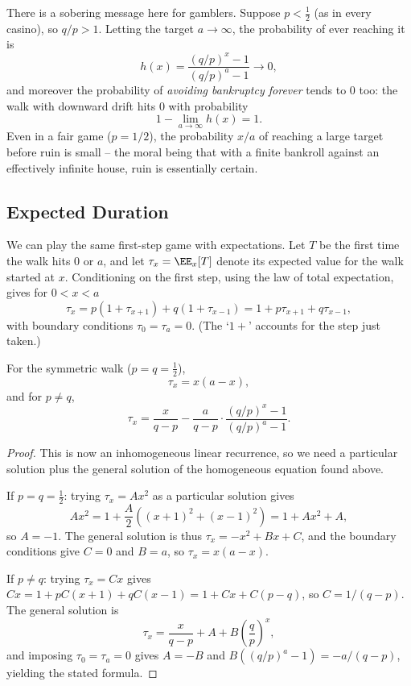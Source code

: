 There is a sobering message here for gamblers. Suppose $p < \frac12$ (as in every casino), so $q/p > 1$. Letting the target $a \rightarrow \infty$, the probability of ever reaching it is
$$
h(x) = \frac{(q/p)^x - 1}{(q/p)^a - 1} \longrightarrow 0,
$$
and moreover the probability of \emph{avoiding bankruptcy forever} tends to $0$ too: the walk with downward drift hits $0$ with probability
$$
1 - \lim_{a \to \infty}h(x) = 1.
$$
Even in a fair game ($p = 1/2$), the probability $x/a$ of reaching a large target before ruin is small -- the moral being that with a finite bankroll against an effectively infinite house, ruin is essentially certain.

\subsection{Expected Duration}

We can play the same first-step game with expectations. Let $T$ be the first time the walk hits $0$ or $a$, and let $\tau_x = \EE_x[T]$ denote its expected value for the walk started at $x$. Conditioning on the first step, using the law of total expectation, gives for $0 < x < a$
$$
\tau_x = p(1 + \tau_{x + 1}) + q(1 + \tau_{x - 1}) = 1 + p\tau_{x+1} + q\tau_{x - 1},
$$
with boundary conditions $\tau_0 = \tau_a = 0$. (The `$1 +$' accounts for the step just taken.)

\begin{proposition}
	For the symmetric walk ($p = q = \frac12$),
	$$
	\tau_x = x(a - x),
	$$
	and for $p \neq q$,
	$$
	\tau_x = \frac{x}{q - p} - \frac{a}{q - p}\cdot \frac{(q/p)^x - 1}{(q/p)^a - 1}.
	$$
\end{proposition}
\begin{proof}
	This is now an inhomogeneous linear recurrence, so we need a particular solution plus the general solution of the homogeneous equation found above.

	If $p = q = \frac12$: trying $\tau_x = Ax^2$ as a particular solution gives
	$$
	Ax^2 = 1 + \frac{A}{2}\left((x+1)^2 + (x-1)^2\right) = 1 + Ax^2 + A,
	$$
	so $A = -1$. The general solution is thus $\tau_x = -x^2 + Bx + C$, and the boundary conditions give $C = 0$ and $B = a$, so $\tau_x = x(a - x)$.

	If $p \neq q$: trying $\tau_x = Cx$ gives $Cx = 1 + pC(x+1) + qC(x - 1) = 1 + Cx + C(p - q)$, so $C = 1/(q - p)$. The general solution is
	$$
	\tau_x = \frac{x}{q - p} + A + B\left(\frac{q}{p}\right)^x,
	$$
	and imposing $\tau_0 = \tau_a = 0$ gives $A = -B$ and $B\left((q/p)^a - 1\right) = -a/(q-p)$, yielding the stated formula.
\end{proof}

